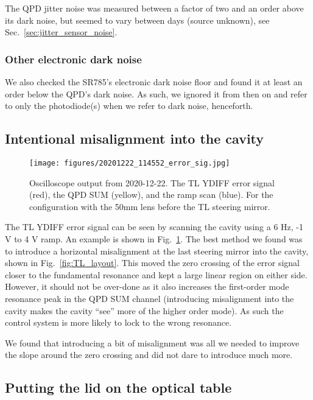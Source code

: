 \documentclass[aps,pra,superscriptaddress,reprint,nofootinbib]{revtex4-1}
\begin{document}
The QPD jitter noise was measured between a factor of two and an order above its dark noise, but seemed to vary between days (source unknown), see Sec.~\ref{sec:jitter_sensor_noise}.

\subsubsection{Other electronic dark noise}

We also checked the SR785’s electronic dark noise floor and found it at least an order below the QPD’s dark noise. As such, we ignored it from then on and refer to only the photodiode(s) when we refer to dark noise, henceforth.

\subsection{Intentional misalignment into the cavity}
\label{sec:misalignment}

\begin{figure}
\texttt{[image: figures/20201222\_114552\_error\_sig.jpg]}
\caption{Oscilloscope output from 2020-12-22. The TL YDIFF error signal (red), the QPD SUM (yellow), and the ramp scan (blue). For the configuration with the 50mm lens before the TL steering mirror.}
\label{fig:TL_error_sig_example}
\end{figure}

The TL YDIFF error signal can be seen by scanning the cavity using a 6 Hz, -1 V to 4 V ramp. An example is shown in Fig.~\ref{fig:TL_error_sig_example}. The best method we found was to introduce a horizontal misalignment at the last steering mirror into the cavity, shown in Fig.~\ref{fig:TL_layout}. This moved the zero crossing of the error signal closer to the fundamental resonance and kept a large linear region on either side. However, it should not be over-done as it also increases the first-order mode resonance peak in the QPD SUM channel (introducing misalignment into the cavity makes the cavity ``see'' more of the higher order mode). As such the control system is more likely to lock to the wrong resonance.

We found that introducing a bit of misalignment was all we needed to improve the slope around the zero crossing and did not dare to introduce much more.

\subsection{Putting the lid on the optical table}
\end{document}
